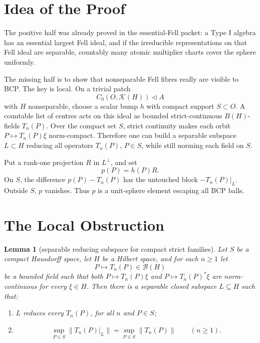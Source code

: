 \documentclass[11pt]{article}
\newtheorem{lemma}{Lemma}
\newcommand{\Kcal}{\mathcal K}
\newcommand{\Bcal}{\mathcal B}
\begin{document}
\section*{Idea of the Proof}

The positive half was already proved in the essential-Fell packet: a Type I
algebra has an essential largest Fell ideal, and if the irreducible
representations on that Fell ideal are separable, countably many atomic
multiplier charts cover the sphere uniformly.

The missing half is to show that nonseparable Fell fibres really are visible
to BCP.  The key is local.  On a trivial patch
\[
        C_0(O,\Kcal(H))\triangleleft A
\]
with \(H\) nonseparable, choose a scalar bump \(h\) with compact support
\(S\subset O\).  A countable list of centres acts on this ideal as bounded
strict-continuous \(B(H)\)-fields \(T_n(P)\).  Over the compact set \(S\),
strict continuity makes each orbit \(P\mapsto T_n(P)\xi\) norm-compact.
Therefore one can build a separable subspace \(L\subset H\) reducing all
operators \(T_n(P)\), \(P\in S\), while still norming each field on \(S\).

Put a rank-one projection \(R\) in \(L^\perp\), and set
\[
        p(P)=h(P)R.
\]
On \(S\), the difference \(p(P)-T_n(P)\) has the untouched block
\(-T_n(P)|_L\).  Outside \(S\), \(p\) vanishes.  Thus \(p\) is a unit-sphere
element escaping all BCP balls.

\section*{The Local Obstruction}

\begin{lemma}[separable reducing subspace for compact strict families]
\label{lem:strict-reducing}
Let \(S\) be a compact Hausdorff space, let \(H\) be a Hilbert space, and for
each \(n\ge1\) let
\[
        P\longmapsto T_n(P)\in\Bcal(H)
\]
be a bounded field such that both \(P\mapsto T_n(P)\xi\) and
\(P\mapsto T_n(P)^*\xi\) are norm-continuous for every \(\xi\in H\).
Then there is a separable closed subspace \(L\subseteq H\) such that:
\begin{enumerate}
    \item \(L\) reduces every \(T_n(P)\), for all \(n\) and \(P\in S\);
    \item
          \[
             \sup_{P\in S}\|T_n(P)|_L\|
             =
             \sup_{P\in S}\|T_n(P)\|
             \qquad(n\ge1).
          \]
\end{enumerate}
\end{lemma}
\end{document}
